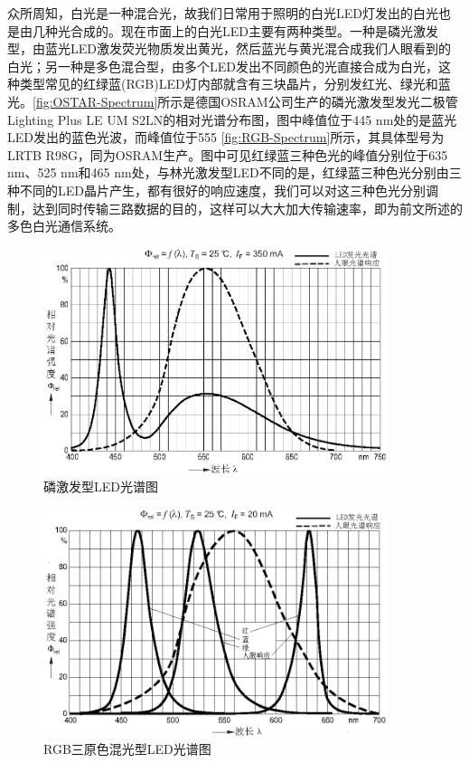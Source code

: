 众所周知，白光是一种混合光，故我们日常用于照明的白光LED灯发出的白光也是由几种光合成的。现在市面上的白光LED主要有两种类型。一种是磷光激发型，由蓝光LED激发荧光物质发出黄光，然后蓝光与黄光混合成我们人眼看到的白光；另一种是多色混合型，由多个LED发出不同颜色的光直接合成为白光，这种类型常见的红绿蓝(RGB)LED灯内部就含有三块晶片，分别发红光、绿光和蓝光。\autoref{fig:OSTAR-Spectrum}所示是德国OSRAM公司生产的磷光激发型发光二极管Lighting Plus LE UM S2LN的相对光谱分布图\cite{LE2011}，图中峰值位于445 nm处的是蓝光LED发出的蓝色光波，而峰值位于555 \autoref{fig:RGB-Spectrum}所示，其具体型号为LRTB R98G，同为OSRAM生产。图中可见红绿蓝三种色光的峰值分别位于635 nm、525 nm和465 nm处，与林光激发型LED不同的是，红绿蓝三种色光分别由三种不同的LED晶片产生，都有很好的响应速度，我们可以对这三种色光分别调制，达到同时传输三路数据的目的，这样可以大大加大传输速率，即为前文所述的多色白光通信系统。

\begin{figure}[htbp]
\centering
\includegraphics[width=0.9\textwidth]{figures/chapter-2/LEUWS2LN-RelativeSpectralEmission.eps}
\caption{磷激发型LED光谱图}
\label{fig:OSTAR-Spectrum}
\end{figure}

\begin{figure}[htbp]
\centering
\includegraphics[width=0.9\textwidth]{figures/chapter-2/LRTBR98G-RGB-RelativeSpectralEmission.eps}
\caption{RGB三原色混光型LED光谱图}
\label{fig:RGB-Spectrum}
\end{figure}



